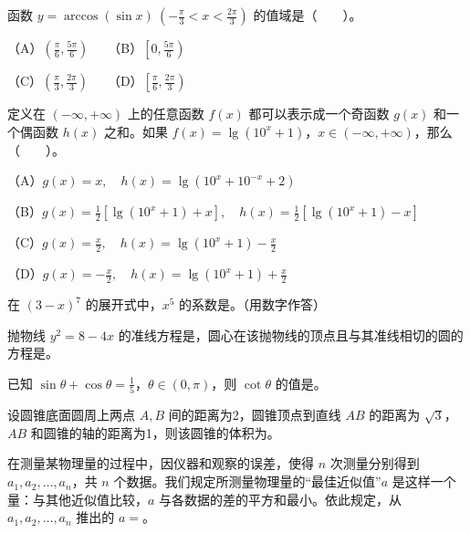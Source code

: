 \begin{question}
函数 $y=\arccos(\sin x)\ \left(-\frac\pi3<x<\frac{2\pi}3\right)$ 的值域是\mbox{（　　）}。

（A）$\left(\frac\pi6,\frac{5\pi}6\right)$　　（B）$\left[0,\frac{5\pi}6\right)$

（C）$\left(\frac\pi3,\frac{2\pi}3\right)$　　（D）$\left[\frac\pi6,\frac{2\pi}3\right)$

\end{question}
\begin{question}
定义在 $(-\infty,+\infty)$ 上的任意函数 $f(x)$ 都可以表示成一个奇函数 $g(x)$ 和一个偶函数 $h(x)$ 之和。如果 $f(x)=\lg(10^x+1)$，$x\in(-\infty,+\infty)$，那么\mbox{（　　）}。

（A）$g(x)=x,\quad h(x)=\lg(10^x+10^{-x}+2)$

（B）$g(x)=\frac12[\lg(10^x+1)+x],\quad h(x)=\frac12[\lg(10^x+1)-x]$

（C）$g(x)=\frac{x}{2},\quad h(x)=\lg(10^x+1)-\frac{x}{2}$

（D）$g(x)=-\frac{x}{2},\quad h(x)=\lg(10^x+1)+\frac{x}{2}$

\end{question}
\begin{question}
在 $(3-x)^7$ 的展开式中，$x^5$ 的系数是\underline{\qquad\qquad}。（用数字作答）

\end{question}
\begin{question}
抛物线 $y^2=8-4x$ 的准线方程是\underline{\qquad\qquad}，圆心在该抛物线的顶点且与其准线相切的圆的方程是\underline{\qquad\qquad}。

\end{question}
\begin{question}
已知 $\sin\theta+\cos\theta=\frac15$，$\theta\in(0,\pi)$，则 $\cot\theta$ 的值是\underline{\qquad\qquad}。

\end{question}
\begin{question}
设圆锥底面圆周上两点 $A,B$ 间的距离为2，圆锥顶点到直线 $AB$ 的距离为 $\sqrt3$，$AB$ 和圆锥的轴的距离为1，则该圆锥的体积为\underline{\qquad\qquad}。

\end{question}
\begin{question}
在测量某物理量的过程中，因仪器和观察的误差，使得 $n$ 次测量分别得到 $a_1,a_2,\ldots,a_n$，共 $n$ 个数据。我们规定所测量物理量的“最佳近似值”$a$ 是这样一个量：与其他近似值比较，$a$ 与各数据的差的平方和最小。依此规定，从 $a_1,a_2,\ldots,a_n$ 推出的 $a=$\underline{\qquad\qquad}。

\end{question}
